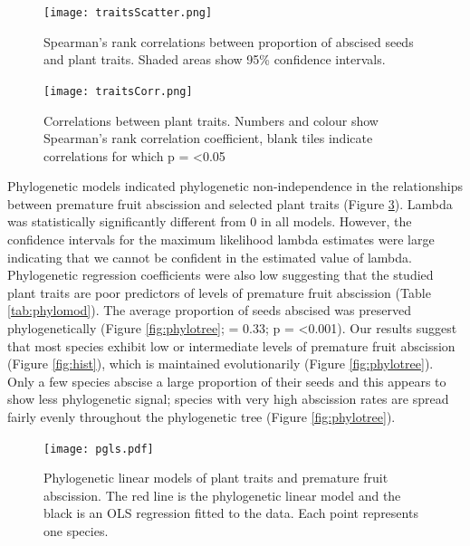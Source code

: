 \begin{figure}[!h]
\centering
\texttt{[image: traitsScatter.png]}
\caption{Spearman’s rank correlations between proportion of abscised seeds and plant traits. Shaded areas show 95\% confidence intervals.}
\label{fig:corr}
\end{figure}

\begin{figure}[!h]
\centering
\texttt{[image: traitsCorr.png]}
\caption{Correlations between plant traits. Numbers and colour show Spearman’s rank correlation coefficient, blank tiles indicate correlations for which p = \textless0.05}
\label{fig:corrmat}
\end{figure}

Phylogenetic models indicated phylogenetic non-independence in the relationships between premature fruit abscission and selected plant traits (Figure \ref{fig:phylomod}). Lambda was statistically significantly different from 0 in all models. However, the confidence intervals for the maximum likelihood lambda estimates were large indicating that we cannot be confident in the estimated value of lambda. Phylogenetic regression coefficients were also low suggesting that the studied plant traits are poor predictors of levels of premature fruit abscission (Table \ref{tab:phylomod}). 
The average proportion of seeds abscised was preserved phylogenetically (Figure \ref{fig:phylotree}; \textlambda = 0.33; p = \textless 0.001). Our results suggest that most species exhibit low or intermediate levels of premature fruit abscission (Figure \ref{fig:hist}), which is maintained evolutionarily (Figure \ref{fig:phylotree}). Only a few species abscise a large proportion of their seeds and this appears to show less phylogenetic signal; species with very high abscission rates are spread fairly evenly throughout the phylogenetic tree (Figure \ref{fig:phylotree}).\\

\begin{figure}[!h]
\centering
\texttt{[image: pgls.pdf]}
\caption{Phylogenetic linear models of plant traits and premature fruit abscission. The red line is the phylogenetic linear model and the black is an OLS regression fitted to the data. Each point represents one species.}
\label{fig:phylomod}
\end{figure}


